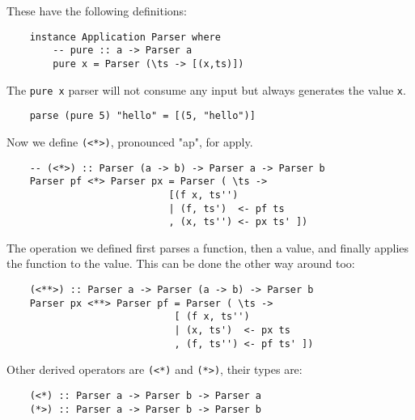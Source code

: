 \documentclass[a4paper,12pt]{article}
\theoremstyle{remark}
\begin{document}
These have the following definitions:

\begin{lstlisting}
    instance Application Parser where
        -- pure :: a -> Parser a
        pure x = Parser (\ts -> [(x,ts)])  \end{lstlisting}

The \lstinline{pure x} parser will not consume any input but always generates the value \lstinline{x}.

\begin{lstlisting}
    parse (pure 5) "hello" = [(5, "hello")]  \end{lstlisting}

Now we define \lstinline{(<*>)}, pronounced "ap", for apply.

\begin{lstlisting}
    -- (<*>) :: Parser (a -> b) -> Parser a -> Parser b
    Parser pf <*> Parser px = Parser ( \ts ->
                            [(f x, ts'')
                            | (f, ts')  <- pf ts
                            , (x, ts'') <- px ts' ])  \end{lstlisting}

\begin{figure}[H]
  \centering
\end{figure}

The operation we defined first parses a function, then a value, and finally applies
the function to the value. This can be done the other way around too:

\begin{lstlisting}
    (<**>) :: Parser a -> Parser (a -> b) -> Parser b
    Parser px <**> Parser pf = Parser ( \ts ->
                             [ (f x, ts'')
                             | (x, ts')  <- px ts
                             , (f, ts'') <- pf ts' ])  \end{lstlisting}

\begin{figure}[H]
  \centering
\end{figure}

Other derived operators are \lstinline{(<*)} and \lstinline{(*>)}, their types are:

\begin{lstlisting}
    (<*) :: Parser a -> Parser b -> Parser a
    (*>) :: Parser a -> Parser b -> Parser b  \end{lstlisting}
\end{document}
